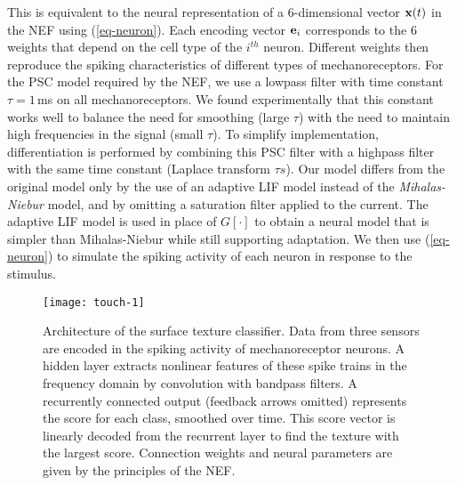 This is equivalent to the neural representation of a $6$-dimensional vector $\mathbf{x}(t)$ in the NEF using (\ref{eq-neuron}). Each encoding vector $\mathbf{e}_i$ corresponds to the $6$ weights that depend on the cell type of the $i^{th}$ neuron. Different weights then reproduce the spiking characteristics of different types of mechanoreceptors.  For the PSC model required by the NEF, we use a lowpass filter with time constant $\tau = 1$\,ms on all mechanoreceptors. We found experimentally that this constant works well to balance the need for smoothing (large $\tau$) with the need to maintain high frequencies in the signal (small $\tau$).  To simplify implementation, differentiation is performed by combining this PSC filter with a highpass filter with the same time constant (Laplace transform $\tau s$). Our model differs from the original model only by  the use of an adaptive LIF model instead of the {\it Mihalas-Niebur} model, and by omitting a saturation filter applied to the current. The adaptive LIF model is used in place of $G[\cdot]$ to obtain a neural model that is simpler than Mihalas-Niebur while still supporting adaptation. We then use (\ref{eq-neuron}) to simulate the spiking activity of each neuron in response to the stimulus.

\begin{figure}[!tbp]
    \centering
    \vspace{-2pt}
    \texttt{[image: touch-1]}
     
    \caption{\label{fig:touch-network} Architecture of the surface texture classifier. Data from three sensors are encoded in the spiking activity of mechanoreceptor neurons. A hidden layer extracts nonlinear features of these spike trains in the frequency domain by convolution with bandpass filters. A recurrently connected output (feedback arrows omitted) represents the score for each class, smoothed over time. This score vector is linearly decoded from the recurrent layer to find the texture with the largest score. Connection weights and neural parameters  are given by the principles of the NEF.}
\end{figure}


